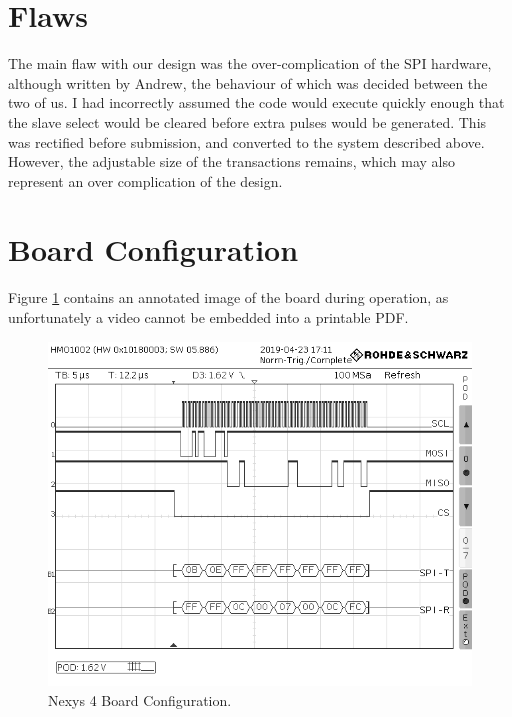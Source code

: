 \documentclass[11pt,british]{report}
\begin{document}
\section*{Flaws}
The main flaw with our design was the over-complication of the SPI hardware, although written by Andrew, the behaviour of which was decided between the two of us. I had incorrectly assumed the code would execute quickly enough that the slave select would be cleared before extra pulses would be generated. This was rectified before submission, and converted to the system described above. However, the adjustable size of the transactions remains, which may also represent an over complication of the design.

\section*{Board Configuration}
Figure \ref{fig:brd_cfg} contains an annotated image of the board during operation, as unfortunately a video cannot be embedded into a printable PDF.
\begin{figure}[h]
	\centering
	\includegraphics[width=\textwidth]{LAB-02}
	\caption{Nexys 4 Board Configuration.}
	\label{fig:brd_cfg}
\end{figure}
\end{document}

